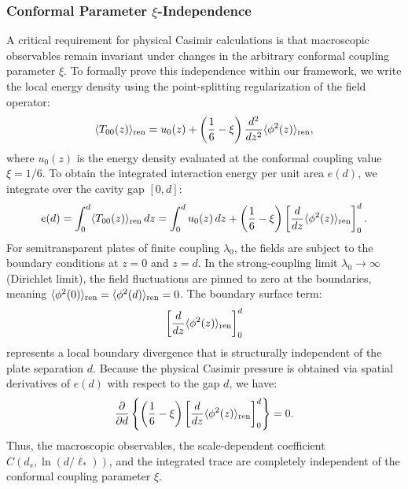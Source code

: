 \documentclass[12pt,letterpaper]{article}
\begin{document}
\subsubsection{Conformal Parameter $\xi$-Independence}
A critical requirement for physical Casimir calculations is that macroscopic observables remain invariant under changes in the arbitrary conformal coupling parameter $\xi$. To formally prove this independence within our framework, we write the local energy density using the point-splitting regularization of the field operator:
\begin{equation}
\langle T_{00}(z) \rangle_{\rm ren} = u_0(z) + \left(\frac{1}{6} - \xi\right) \frac{d^2}{dz^2} \langle \phi^2(z) \rangle_{\rm ren},
\label{eq:SI_T00}
\end{equation}
where $u_0(z)$ is the energy density evaluated at the conformal coupling value $\xi = 1/6$. To obtain the integrated interaction energy per unit area $e(d)$, we integrate over the cavity gap $[0, d]$:
\begin{equation}
e(d) = \int_{0}^{d} \langle T_{00}(z) \rangle_{\rm ren} \, dz = \int_{0}^{d} u_0(z) \, dz + \left(\frac{1}{6} - \xi\right) \left[ \frac{d}{dz} \langle \phi^2(z) \rangle_{\rm ren} \right]_{0}^{d}.
\label{eq:SI_energy_proof}
\end{equation}
For semitransparent plates of finite coupling $\lambda_0$, the fields are subject to the boundary conditions at $z=0$ and $z=d$. In the strong-coupling limit $\lambda_0 \to \infty$ (Dirichlet limit), the field fluctuations are pinned to zero at the boundaries, meaning $\langle \phi^2(0) \rangle_{\rm ren} = \langle \phi^2(d) \rangle_{\rm ren} = 0$. The boundary surface term:
\begin{equation}
\left[ \frac{d}{dz} \langle \phi^2(z) \rangle_{\rm ren} \right]_{0}^{d}
\label{eq:SI_surface_term}
\end{equation}
represents a local boundary divergence that is structurally independent of the plate separation $d$. Because the physical Casimir pressure is obtained via spatial derivatives of $e(d)$ with respect to the gap $d$, we have:
\begin{equation}
\frac{\partial}{\partial d} \left\{ \left(\frac{1}{6} - \xi\right) \left[ \frac{d}{dz} \langle \phi^2(z) \rangle_{\rm ren} \right]_{0}^{d} \right\} = 0.
\label{eq:SI_derivative_xi}
\end{equation}
Thus, the macroscopic observables, the scale-dependent coefficient $C(d_s, \ln(d/\ell_*))$, and the integrated trace are completely independent of the conformal coupling parameter $\xi$.
\end{document}
